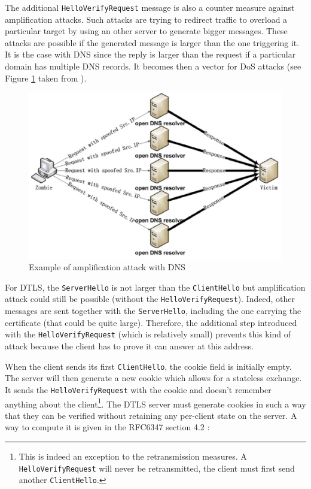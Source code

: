 The additional \texttt{HelloVerifyRequest} message is also a counter measure against amplification attacks. Such attacks are trying to redirect traffic to overload a particular target by using an other server to generate bigger messages. These attacks are possible if the generated message is larger than the one triggering it. It is the case with DNS since the reply is larger than the request if a particular domain has multiple DNS records. It becomes then a vector for DoS attacks (see Figure \ref{fig:amp_attack} taken from \cite{dns-amp}).


\begin{figure}[!ht]
\centering
\includegraphics[width=\textwidth]{images/amplificationattacks}
\caption{Example of amplification attack with DNS}
\label{fig:amp_attack}
\end{figure}

For DTLS, the \texttt{ServerHello} is not larger than the \texttt{ClientHello} but amplification attack could still be possible (without the \texttt{HelloVerifyRequest}). Indeed, other messages are sent together with the \texttt{ServerHello}, including the one carrying the certificate (that could be quite large). Therefore, the additional step introduced with the \texttt{HelloVerifyRequest} (which is relatively small) prevents this kind of attack because the client has to prove it can answer at this address.

When the client sends its first \texttt{ClientHello}, the cookie field is initially empty. The server will then generate a new cookie which allows for a stateless exchange. It sends the \texttt{HelloVerifyRequest} with the cookie and doesn't remember anything about the client\footnote{This is indeed an exception to the retransmission measures. A \texttt{HelloVerifyRequest} will never be retransmitted, the client must first send another \texttt{ClientHello}.}. The DTLS server must generate cookies in such a way that they can be verified without retaining any per-client state on the server. A way to compute it is given in the RFC6347 section 4.2 \cite{rfc6347}:

